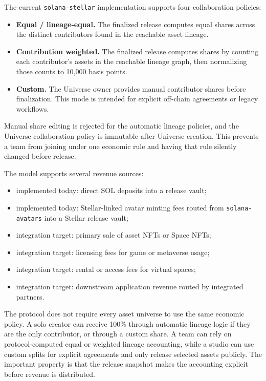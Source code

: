 \documentclass[10pt,twocolumn]{article}
\newcommand{\protocol}[1]{\texttt{#1}}
\newcommand{\bp}{basis points}
\begin{document}
The current \protocol{solana-stellar} implementation supports four collaboration policies:
\begin{itemize}
    \item \textbf{Equal / lineage-equal.} The finalized release computes equal shares across the distinct contributors found in the reachable asset lineage.
    \item \textbf{Contribution weighted.} The finalized release computes shares by counting each contributor's assets in the reachable lineage graph, then normalizing those counts to 10,000 \bp{}.
    \item \textbf{Custom.} The Universe owner provides manual contributor shares before finalization. This mode is intended for explicit off-chain agreements or legacy workflows.
\end{itemize}

Manual share editing is rejected for the automatic lineage policies, and the Universe collaboration policy is immutable after Universe creation. This prevents a team from joining under one economic rule and having that rule silently changed before release.

The model supports several revenue sources:
\begin{itemize}
    \item implemented today: direct SOL deposits into a release vault;
    \item implemented today: Stellar-linked avatar minting fees routed from \protocol{solana-avatars} into a Stellar release vault;
    \item integration target: primary sale of asset NFTs or Space NFTs;
    \item integration target: licensing fees for game or metaverse usage;
    \item integration target: rental or access fees for virtual spaces;
    \item integration target: downstream application revenue routed by integrated partners.
\end{itemize}

The protocol does not require every asset universe to use the same economic policy. A solo creator can receive 100\% through automatic lineage logic if they are the only contributor, or through a custom share. A team can rely on protocol-computed equal or weighted lineage accounting, while a studio can use custom splits for explicit agreements and only release selected assets publicly. The important property is that the release snapshot makes the accounting explicit before revenue is distributed.
\end{document}
